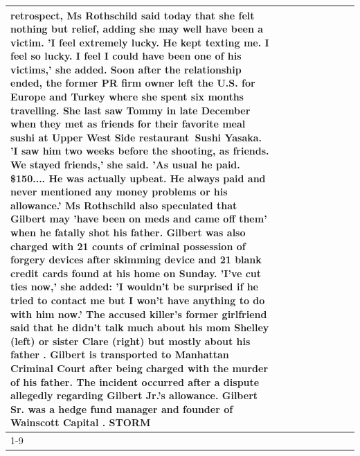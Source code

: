\begin{table}[H]
\begin{tabular}{lllrlllll}
retrospect, Ms Rothschild said today that she felt nothing but relief, adding she may well have been a victim. 'I feel extremely lucky. He kept texting me. I feel so lucky. I feel I could have been one of his victims,' she added. Soon after the relationship ended, the former PR firm owner left the U.S. for Europe and Turkey where she spent six months  travelling. She last saw Tommy in late December when they met as friends for their favorite meal sushi at Upper West Side restaurant Sushi Yasaka. 'I saw him two weeks before the shooting, as friends. We stayed friends,' she said. 'As usual he paid. \$150.... He was actually upbeat. He always paid and never mentioned any money problems or his allowance.' Ms Rothschild also speculated that Gilbert may 'have been on meds and came off them' when he fatally shot his father. Gilbert was also charged with 21 counts of criminal possession of forgery devices after skimming device and 21 blank credit cards found at his home on Sunday. 'I've cut ties now,' she added: 'I wouldn’t be surprised if he tried to contact me but I won’t have anything to do with him now.' The accused killer's former girlfriend said that he didn't talk much about his mom Shelley (left) or sister Clare (right) but mostly about his father . Gilbert is transported to Manhattan Criminal Court  after being charged with the murder of his father. The incident occurred after a dispute allegedly regarding Gilbert Jr.'s allowance. Gilbert Sr. was a hedge fund manager and founder of Wainscott Capital . STORM \\
\cline{1-9} \cline{2-9}

\end{tabular}
\end{table}

